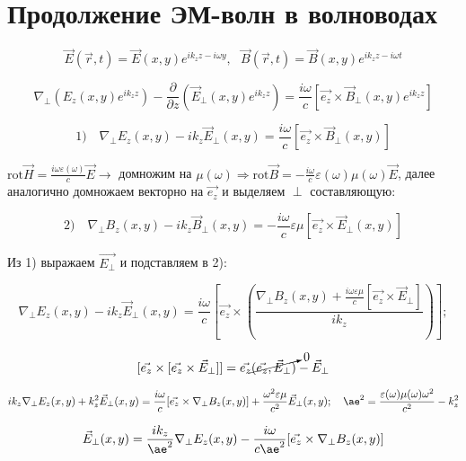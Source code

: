 \documentclass[12pt, a4paper]{report}
\begin{document}
\fi


\section{Продолжение ЭМ-волн в волноводах}

\[ \vec{E } (\vec{r } ,t ) = \vec{E } (x, y ) e^{ i k_z z - i \omega y }, \text{ } \vec{B } (\vec{r } , t )= \vec{B } (x,y) e^{  i k_z z - i \omega t}    \] 

\[ \nabla_{ \perp  } (E_z (x,y ) e^{ i k_z z })   - \frac{\partial}{\partial  z } (\vec{E } _{ \perp } (x,y ) e^{ i k_z z }) =  \frac{ i \omega}{c }[ \vec{e_z} \times  \vec{B} _{ \perp } (x,y ) e^{ i k_z z}  ]   \] 

\[ 1)\quad  \nabla_{ \perp } E_z (x, y ) - i k_z \vec{E } _{\perp  } (x,y   ) = \frac{ i \omega }{c } [ \vec{e_z} \times  \vec{B} _{ \perp } (x,y ) ]   \] 

\( \displaystyle \mathrm{rot } \vec{H } = \frac{i \omega \varepsilon (\omega)}{c } \vec{E}  \to  \)  домножим на \( \displaystyle \mu (\omega)  \Rightarrow \mathrm{rot } \vec{B } = - \frac{i \omega }{c } \varepsilon (\omega ) \mu (\omega) \vec{E }   \), далее аналогично домножаем векторно на \( \vec{e_z}  \)  и выделяем \( \perp  \) составляющую: 

\[ 2) \quad \nabla_{ \perp } B_z (x,y ) - i k_z \vec{B } _{\perp } (x,y ) = - \frac{i \omega }{c } \varepsilon \mu [\vec{e_z} \times  \vec{E} _{ \perp } (x,y ) ]   \] 

Из 1) выражаем \( \vec{E_{\perp }}   \) и подставляем в 2):

\[ \nabla_{ \perp } E_z (x,y ) - i k_z \vec{E }_{\perp  }(x,y ) = \frac{i \omega }{c } \left[ \vec{e_z} \times \left( \frac{\nabla_{ \perp } B_z (x,y )  + \frac{i \omega \varepsilon \mu}{c } [\vec{e_z} \times  \vec{E} _{ \perp }]  }  {i k_z}  \right) \right] ;     \] 

\[ [\vec{e_z }\times [\vec{e_z }\times  \vec{E } _{\perp  }  ]  ] = \vec{e_z } \cancelto{0}{(\vec{e_z }, \vec{E }_{\perp  }   )} - \vec{E } _{ \perp }  \] 

\[ i k_z \nabla_{ \perp  } E_z (x,y ) + k_z ^2 \vec{E } _{\perp  } (x,y ) = \frac{ i \omega }{c } [ \vec{e_z } \times \nabla_{ \perp  } B_z (x,y )  ] + \frac{ \omega ^2 \varepsilon \mu }{c ^2 }  \vec{E }_{ \perp }     ( x,y ) ; \quad \ae ^2 = \frac{ \varepsilon (\omega )\mu (\omega ) \omega ^2 }{c ^2 }   - k_z ^2   \] 

\[ \vec{E } _{\perp  } (x,y) = \frac{i k_z }{ \ae ^2 } \nabla_{ \perp } E_z (x,y ) - \frac{ i \omega }{c \ae ^2  } [ \vec{e_z  } \times  \nabla_{ \perp } B_z (x,y ) ]     \] 
\end{document}
